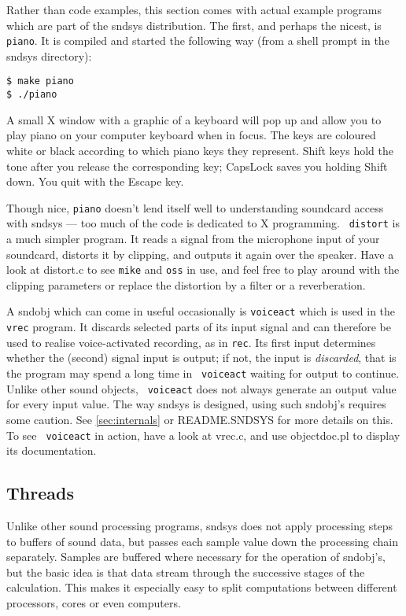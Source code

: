 \documentclass{article}
\def\s{{\sc sndsys} }
\def\bv{\begin{verbatim}}
\begin{document}
Rather than code examples, this section comes with actual example programs
which are part of the \s distribution.  The first, and perhaps the nicest, 
is {\tt piano}.  It is compiled and started the following way (from a shell
prompt in the \s directory):

\bv
$ make piano
$ ./piano
\end{verbatim}

A small X window with a graphic of a keyboard will pop up and allow you to play
piano on your computer keyboard when in focus.  The keys are coloured white or
black according to which piano keys they represent.  Shift keys hold the tone
after you release the corresponding key; CapsLock saves you holding Shift down.
You quit with the Escape key.

Though nice, {\tt piano} doesn't lend itself well to understanding soundcard
access with \s --- too much of the code is dedicated to X programming.  {\tt
distort} is a much simpler program.  It reads a signal from the microphone
input of your soundcard, distorts it by clipping, and outputs it again over the
speaker.  Have a look at distort.c to see {\tt mike} and {\tt oss} in use, and
feel free to play around with the clipping parameters or replace the distortion
by a filter or a reverberation.

A sndobj which can come in useful occasionally is {\tt voiceact} which is used
in the {\tt vrec} program.  It discards selected parts of its input signal and
can therefore be used to realise voice-activated recording, as in {\tt rec}.
Its first input determines whether the (second) signal input is output; if not,
the input is {\it discarded}, that is the program may spend a long time in {\tt
voiceact} waiting for output to continue.  Unlike other sound objects, {\tt
voiceact} does not always generate an output value for every input value.  The
way \s is designed, using such sndobj's requires some caution.  See
\autoref{sec:internals} or README.SNDSYS for more details on this.  To see {\tt
voiceact} in action, have a look at vrec.c, and use objectdoc.pl to display its
documentation.


\subsection{Threads}

Unlike other sound processing programs, \s does not apply processing steps to
buffers of sound data, but passes each sample value down the processing chain
separately.  Samples are buffered where necessary for the operation of sndobj's,
but the basic idea is that data stream through the successive stages of the
calculation.  This makes it especially easy to split computations between
different processors, cores or even computers.
\end{document}
